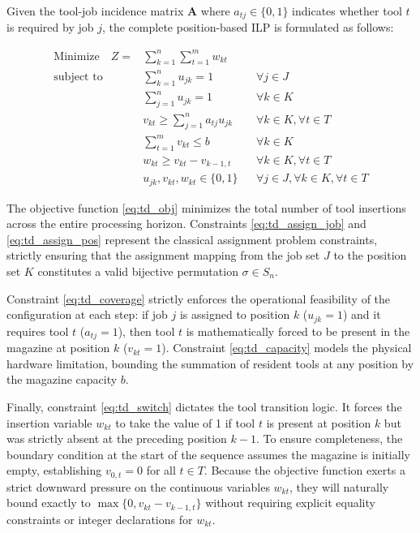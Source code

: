 \documentclass[11pt, a4paper]{book}
\begin{document}
	Given the tool-job incidence matrix $\mathbf{A}$ where $a_{tj} \in \{0,1\}$ indicates whether tool $t$ is required by job $j$, the complete position-based ILP is formulated as follows:
	
	\begin{align}
		\text{Minimize} \quad Z = & \sum_{k=1}^{n} \sum_{t=1}^{m} w_{kt} \label{eq:td_obj} \\
		\text{subject to} \quad & \sum_{k=1}^{n} u_{jk} = 1 && \forall j \in J \label{eq:td_assign_job} \\
		& \sum_{j=1}^{n} u_{jk} = 1 && \forall k \in K \label{eq:td_assign_pos} \\
		& v_{kt} \ge \sum_{j=1}^{n} a_{tj} u_{jk} && \forall k \in K, \forall t \in T \label{eq:td_coverage} \\
		& \sum_{t=1}^{m} v_{kt} \le b && \forall k \in K \label{eq:td_capacity} \\
		& w_{kt} \ge v_{kt} - v_{k-1,t} && \forall k \in K, \forall t \in T \label{eq:td_switch} \\
		& u_{jk}, v_{kt}, w_{kt} \in \{0,1\} && \forall j \in J, \forall k \in K, \forall t \in T \label{eq:td_binary}
	\end{align}
	
	The objective function \eqref{eq:td_obj} minimizes the total number of tool insertions across the entire processing horizon. Constraints \eqref{eq:td_assign_job} and \eqref{eq:td_assign_pos} represent the classical assignment problem constraints, strictly ensuring that the assignment mapping from the job set $J$ to the position set $K$ constitutes a valid bijective permutation $\sigma \in S_n$. 
	
	Constraint \eqref{eq:td_coverage} strictly enforces the operational feasibility of the configuration at each step: if job $j$ is assigned to position $k$ ($u_{jk} = 1$) and it requires tool $t$ ($a_{tj} = 1$), then tool $t$ is mathematically forced to be present in the magazine at position $k$ ($v_{kt} = 1$). Constraint \eqref{eq:td_capacity} models the physical hardware limitation, bounding the summation of resident tools at any position by the magazine capacity $b$. 
	
	Finally, constraint \eqref{eq:td_switch} dictates the tool transition logic. It forces the insertion variable $w_{kt}$ to take the value of 1 if tool $t$ is present at position $k$ but was strictly absent at the preceding position $k-1$. To ensure completeness, the boundary condition at the start of the sequence assumes the magazine is initially empty, establishing $v_{0,t} = 0$ for all $t \in T$. Because the objective function exerts a strict downward pressure on the continuous variables $w_{kt}$, they will naturally bound exactly to $\max\{0, v_{kt} - v_{k-1,t}\}$ without requiring explicit equality constraints or integer declarations for $w_{kt}$.
	
\end{document}
